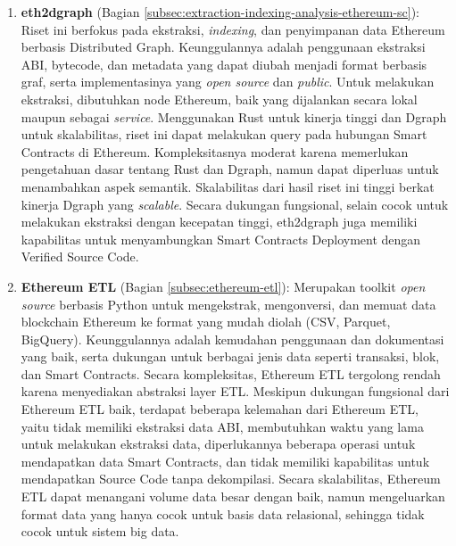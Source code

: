 \begin{enumerate}
	\item \textbf{eth2dgraph} \parencite{aimar2023extraction} (Bagian \ref{subsec:extraction-indexing-analysis-ethereum-sc}): Riset ini berfokus pada ekstraksi, \textit{indexing}, dan penyimpanan data Ethereum berbasis Distributed Graph. Keunggulannya adalah penggunaan ekstraksi ABI, bytecode, dan metadata yang dapat diubah menjadi format berbasis graf, serta implementasinya yang \textit{open source} dan \textit{public}. Untuk melakukan ekstraksi, dibutuhkan node Ethereum, baik yang dijalankan secara lokal maupun sebagai \textit{service}. Menggunakan Rust untuk kinerja tinggi dan Dgraph untuk skalabilitas, riset ini dapat melakukan query pada hubungan Smart Contracts di Ethereum. Kompleksitasnya moderat karena memerlukan pengetahuan dasar tentang Rust dan Dgraph, namun dapat diperluas untuk menambahkan aspek semantik. Skalabilitas dari hasil riset ini tinggi berkat kinerja Dgraph yang \textit{scalable}. Secara dukungan fungsional, selain cocok untuk melakukan ekstraksi dengan kecepatan tinggi, eth2dgraph juga memiliki kapabilitas untuk menyambungkan Smart Contracts Deployment dengan Verified Source Code.

	\item \textbf{Ethereum ETL} \parencite{ethereum_etl} (Bagian \ref{subsec:ethereum-etl}): Merupakan toolkit \textit{open source} berbasis Python untuk mengekstrak, mengonversi, dan memuat data blockchain Ethereum ke format yang mudah diolah (CSV, Parquet, BigQuery). Keunggulannya adalah kemudahan penggunaan dan dokumentasi yang baik, serta dukungan untuk berbagai jenis data seperti transaksi, blok, dan Smart Contracts. Secara kompleksitas, Ethereum ETL tergolong rendah karena menyediakan abstraksi layer ETL. Meskipun dukungan fungsional dari Ethereum ETL baik, terdapat beberapa kelemahan dari Ethereum ETL, yaitu tidak memiliki ekstraksi data ABI, membutuhkan waktu yang lama untuk melakukan ekstraksi data, diperlukannya beberapa operasi untuk mendapatkan data Smart Contracts, dan tidak memiliki kapabilitas untuk mendapatkan Source Code tanpa dekompilasi. Secara skalabilitas, Ethereum ETL dapat menangani volume data besar dengan baik, namun mengeluarkan format data yang hanya cocok untuk basis data relasional, sehingga tidak cocok untuk sistem big data.


\end{enumerate}
